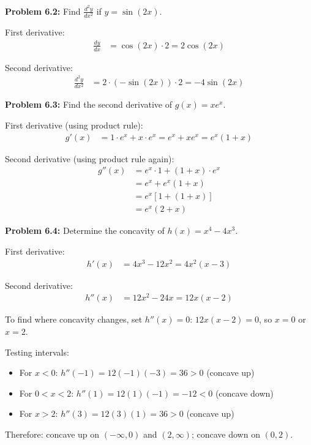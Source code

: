 \documentclass[12pt,a4paper]{book}
\theoremstyle{definition}
\begin{document}
\begin{solution}
\textbf{Problem 6.2:} Find $\frac{d^2y}{dx^2}$ if $y = \sin(2x)$.

First derivative:
\begin{align}
\frac{dy}{dx} &= \cos(2x) \cdot 2 = 2\cos(2x)
\end{align}

Second derivative:
\begin{align}
\frac{d^2y}{dx^2} &= 2 \cdot (-\sin(2x)) \cdot 2 = -4\sin(2x)
\end{align}
\end{solution}

\begin{solution}
\textbf{Problem 6.3:} Find the second derivative of $g(x) = xe^x$.

First derivative (using product rule):
\begin{align}
g'(x) &= 1 \cdot e^x + x \cdot e^x = e^x + xe^x = e^x(1 + x)
\end{align}

Second derivative (using product rule again):
\begin{align}
g''(x) &= e^x \cdot 1 + (1 + x) \cdot e^x\\
&= e^x + e^x(1 + x)\\
&= e^x[1 + (1 + x)]\\
&= e^x(2 + x)
\end{align}
\end{solution}

\begin{solution}
\textbf{Problem 6.4:} Determine the concavity of $h(x) = x^4 - 4x^3$.

First derivative:
\begin{align}
h'(x) &= 4x^3 - 12x^2 = 4x^2(x - 3)
\end{align}

Second derivative:
\begin{align}
h''(x) &= 12x^2 - 24x = 12x(x - 2)
\end{align}

To find where concavity changes, set $h''(x) = 0$:
$12x(x - 2) = 0$, so $x = 0$ or $x = 2$.

Testing intervals:
\begin{itemize}
    \item For $x < 0$: $h''(-1) = 12(-1)(-3) = 36 > 0$ (concave up)
    \item For $0 < x < 2$: $h''(1) = 12(1)(-1) = -12 < 0$ (concave down)
    \item For $x > 2$: $h''(3) = 12(3)(1) = 36 > 0$ (concave up)
\end{itemize}

Therefore: concave up on $(-\infty, 0)$ and $(2, \infty)$; concave down on $(0, 2)$.
\end{solution}
\end{document}
